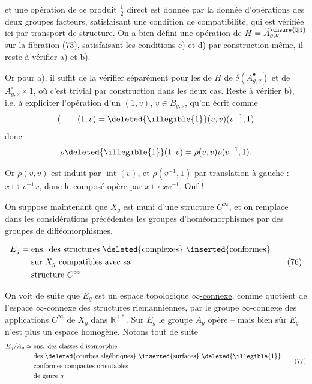 
et une opération de ce produit \(\frac12\) direct est donnée  par  la donnée d'opérations des deux groupes facteurs, satisfaisant une condition de compatibilité, qui est vérifiée ici par transport de structure. On a bien défini une opération de \(H=\widetilde A_{g,\nu}^{\unsure{\natural|\sharp}}\) sur la fibration (73),  satisfaisant les conditions c) et d) par construction même, il reste à vérifier a) et b).

Or pour a), il suffit de la vérifier séparément pour les  de \(H\) de \(\delta(A_{g,\nu}^{\bullet})\) et de \(A_{g,\nu}^{\circ}\times 1\), où c'est trivial par construction dans les deux cas. Reste à vérifier b), i.e. à expliciter l'opération d'un  \((1,v)\), \(v\in B_{g,\nu}\), qu'on écrit comme
\[
 (\qquad (1,v)=\deleted{\illegible{1}}(v,v)(v^{-1},1)
\]
donc
\[
 \rho\deleted{\illegible{1}}(1,v)=\rho(v,v)\rho(v^{-1},1).
\]

Or \(\rho(v,v)\) est induit par \(\operatorname{int}(v)\),  et \(\rho(v^{-1},1)\) par translation à gauche : \(x\mapsto v^{-1}x\), donc le composé opère par \(x\mapsto xv^{-1}\). Ouf !


On suppose maintenant que \(X_g\) est muni d'une structure \(C^\infty\), et on remplace dans les considérations  précédentes les groupes d'homéomorphismes par des groupes de difféomorphismes.

\[
 \begin{aligned}
 E_g={}&\text{ens. des structures \deleted{complexes} \inserted{conformes}}\\
 &\text{sur }X_g\text{ compatibles avec sa}\\
 &\text{structure }C^\infty
 \end{aligned}
 \tag{76}
\]

 On voit de suite que \(E_g\) est un espace topologique \uline{\(\infty\)-connexe}, comme quotient de l'espace \(\infty\)-connexe  des structures riemanniennes, par le  groupe \(\infty\)-connexe des applications \(C^\infty\) de \(X_g\) dans \(\mathbb R^{+*}\). Sur \(E_g\) le groupe \(A_g\) opère -- mais bien sûr \(E_g\) n'est plus un espace homogène. Notons tout de suite
\[
 \begin{aligned}
 E_g/A_g\simeq{}&\text{ens. des classes d'isomorphie}\\
 &\text{des \deleted{courbes algébriques} \inserted{surfaces} \deleted{\illegible{1}}}\\
 &\text{conformes compactes orientables}\\
 &\text{de genre }g
 \end{aligned}
 \tag{77}
\]

